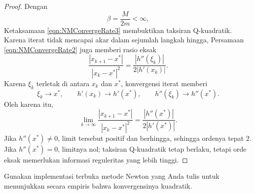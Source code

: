 \begin{proof}
Dengan
\begin{equation}
\beta=\frac{M}{2m}<\infty,
\end{equation}
Ketaksamaan \ref{eqn:NMConvergeRate3} membuktikan taksiran Q-kuadratik. Karena iterat tidak mencapai akar dalam sejumlah langkah hingga, Persamaan \ref{eqn:NMConvergeRate2} juga memberi rasio eksak
\begin{equation}
\frac{|x_{k+1}-x^*|}{|x_k-x^*|^2}
=\frac{|h''(\xi_k)|}{2|h'(x_k)|}.
\end{equation}
Karena $\xi_k$ terletak di antara $x_k$ dan $x^*$, konvergensi iterat memberi
\begin{displaymath}
\xi_k\longrightarrow x^*,\qquad h'(x_k)\longrightarrow h'(x^*),
\qquad h''(\xi_k)\longrightarrow h''(x^*).
\end{displaymath}
Oleh karena itu,
\begin{equation}
\lim_{k\to\infty}\frac{|x_{k+1}-x^*|}{|x_k-x^*|^2}
=\frac{|h''(x^*)|}{2|h'(x^*)|}.
\end{equation}
Jika $h''(x^*)\neq0$, limit tersebut positif dan berhingga, sehingga ordenya tepat $2$. Jika $h''(x^*)=0$, limitnya nol; taksiran Q-kuadratik tetap berlaku, tetapi orde eksak memerlukan informasi reguleritas yang lebih tinggi.
\end{proof}

\begin{exercise} Gunakan implementasi terbuka metode Newton yang Anda tulis untuk menunjukkan secara empiris bahwa konvergensinya kuadratik.
\end{exercise}
